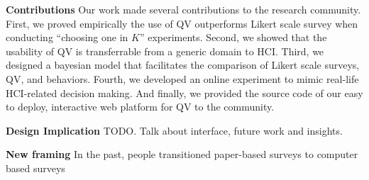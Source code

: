 \textbf{Contributions}
Our work made several contributions to the research community. 
First, we proved empirically 
the use of QV outperforms Likert scale survey
when conducting ``choosing one in $K$'' experiments.
Second, we showed that the usability of QV
is transferrable from a generic domain to HCI.
Third, we designed a bayesian model 
that facilitates the comparison
of Likert scale surveys, QV, and behaviors.
Fourth, we developed an online experiment
to mimic real-life HCI-related decision making.
And finally, we provided the source code of our easy to deploy, 
interactive web platform for QV to the community.

\textbf{Design Implication}
TODO. Talk about interface, future work and insights.

\textbf{New framing}
In the past, 
people transitioned paper-based surveys to computer based surveys
